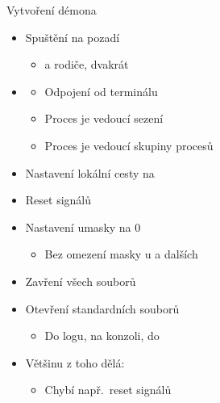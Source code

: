 \begin{frame}{Vytvoření démona}

  \begin{itemize}
    \item Spuštění na pozadí
    \begin{itemize}
      \item {} a  rodiče, dvakrát
    \end{itemize}

    \pause

    \item {}
    \begin{itemize}
      \item Odpojení od terminálu
      \item Proces je vedoucí sezení
      \item Proces je vedoucí skupiny procesů
    \end{itemize}

    \pause

    \item Nastavení lokální cesty na \file{/}

    \pause

    \item Reset signálů

    \pause

    \item Nastavení umasky na 0
    \begin{itemize}
      \item Bez omezení masky u  a dalších
    \end{itemize}

    \pause

    \item Zavření všech souborů

    \pause

    \item Otevření standardních souborů
    \begin{itemize}
      \item Do logu, na konzoli, do 
    \end{itemize}

    \pause

    \item Většinu z toho dělá: 
    \begin{itemize}
      \item Chybí např.\ reset signálů
    \end{itemize}
  \end{itemize}

\end{frame}


